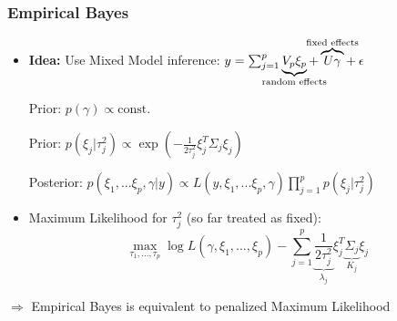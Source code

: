 \documentclass[final]{beamer}
\begin{document}
\begin{frame}
\frametitle{Empirical Bayes}

\begin{itemize}
\item \textcolor{beamer@postercolour}{\textbf{Idea:}} Use Mixed Model inference: $y = \sum_{j=1}^p \underbrace{V_p \xi_p}_{\mathclap{\text{random effects}}} + \overbrace{U \gamma}^{\mathclap{\text{fixed effects}}} + \: \epsilon$ \pause
\vspace{1em}


\textcolor{beamer@postercolour}{Prior: } $ p(\gamma) \propto \text{const.}$ \pause

\textcolor{beamer@postercolour}{Prior: }  $p(\xi_j|\tau_j^2)  \propto \exp\left(-\frac{1}{2\tau^2_j} \xi_j^T\Sigma_j \xi_j\right) $  \pause

\textcolor{beamer@postercolour}{Posterior: }
$p(\xi_1, ... \xi_p, \gamma|y) \propto L(y,\xi_1, ... \xi_p, \gamma)\prod_{j=1}^p p(\xi_j|\tau_j^2) $ \pause
\vspace{1em}

\item Maximum Likelihood for $\tau_j^2$ (so far treated as fixed):
$$\max_{\tau_1, ..., \tau_p} \log L(\gamma, \xi_1,...,\xi_p) - \sum_{j=1}^p \underbrace{\frac{1}{2\tau^2_j}}_{\lambda_j} \xi_j^T \underbrace{\Sigma_j}_{K_j} \xi_j$$
\end{itemize}

\pause

$\Rightarrow$ Empirical Bayes is equivalent to penalized Maximum Likelihood


\end{frame}
\end{document}
